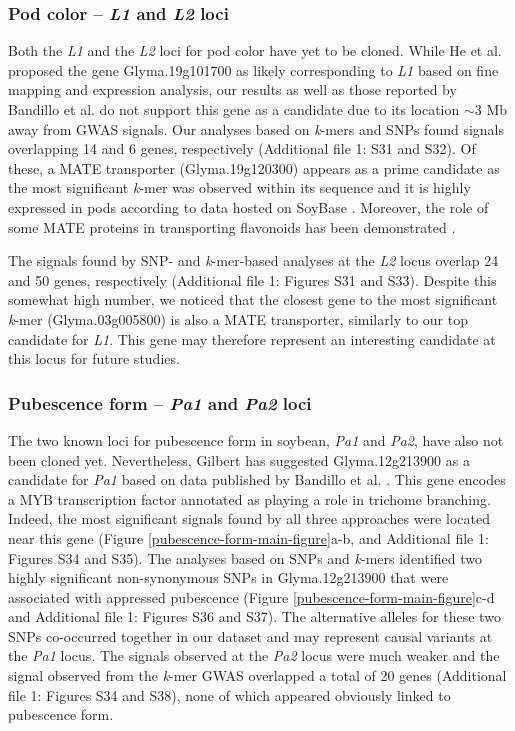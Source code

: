 \documentclass[doublespacing]{bmcart}
\begin{document}
\subsubsection*{Pod color -- \textit{L1} and \textit{L2} loci}

Both the \textit{L1} and the \textit{L2} loci for pod color have yet to be
cloned. While He et al. \cite{he2015} proposed the gene Glyma.19g101700 as likely
corresponding to \textit{L1} based on fine mapping and expression analysis, our
results as well as those reported by Bandillo et al. \cite{bandillo2017} do not support this
gene as a candidate due to its location $\sim$3 Mb away from GWAS signals. Our
analyses based on \textit{k}-mers and SNPs found signals overlapping 14 and
6 genes, respectively (Additional file 1: S31 and
S32). Of these, a MATE transporter (Glyma.19g120300)
appears as a prime candidate as the most significant \emph{k}-mer was observed
within its sequence and it is highly expressed in pods according to data hosted
on SoyBase \citep{grant2010, severin2010}. Moreover, the role of some MATE
proteins in transporting flavonoids has been demonstrated \citep{chen2015}.

The signals found by SNP- and \emph{k}-mer-based analyses at the \textit{L2}
locus overlap 24 and 50 genes, respectively (Additional file 1: Figures
S31 and S33). Despite this
somewhat high number, we noticed that the closest gene to the most significant
\emph{k}-mer (Glyma.03g005800) is also a MATE transporter, similarly to our top
candidate for \emph{L1}. This gene may therefore represent an interesting
candidate at this locus for future studies.

\subsubsection*{Pubescence form -- \textit{Pa1} and \textit{Pa2} loci}
\label{sv-gwas-main-results-pubescence-form-pa1-pa2}

The two known loci for pubescence form in soybean, \textit{Pa1} and
\textit{Pa2}, have also not been cloned yet. Nevertheless, Gilbert \cite{gilbert2017}
has suggested Glyma.12g213900 as a candidate for \textit{Pa1} based on data
published by Bandillo et al. \cite{bandillo2017}. This gene encodes a MYB transcription factor
annotated as playing a role in trichome branching. Indeed, the most significant
signals found by all three approaches were located near this gene (Figure
\ref{pubescence-form-main-figure}a-b, and Additional file 1: Figures S34 and
S35).  The analyses based on SNPs and
\emph{k}-mers identified two highly significant non-synonymous SNPs in
Glyma.12g213900 that were associated with appressed pubescence (Figure
\ref{pubescence-form-main-figure}c-d and Additional file 1: Figures S36 and
S37). The alternative alleles for these two
SNPs co-occurred together in our dataset and may represent causal variants at
the \emph{Pa1} locus. The signals observed at the \emph{Pa2} locus were much
weaker and the signal observed from the \emph{k}-mer GWAS overlapped a total of
20 genes (Additional file 1: Figures S34 and
S38), none of which appeared obviously linked
to pubescence form.
\end{document}
